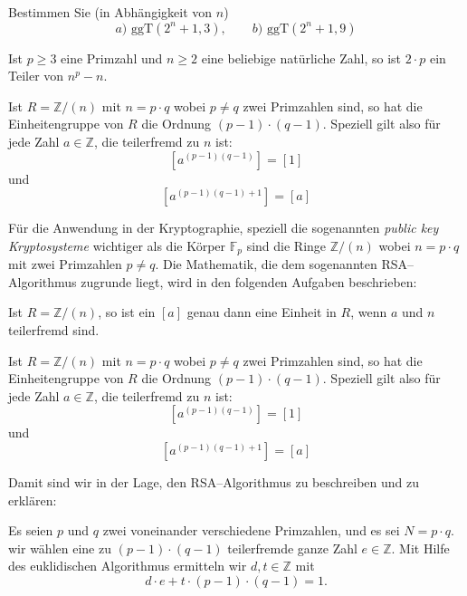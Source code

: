 \begin{aufgabe} Bestimmen Sie (in Abhängigkeit von $n$) 
  	$$ a) \,\, \textrm{ggT}(2^n+1, 3), \qquad b) \,\, \textrm{ggT}(2^n+1, 9) $$
\end{aufgabe}

\begin{aufgabe} Ist $p \geq 3$ eine Primzahl und $n \geq 2$ eine beliebige natürliche Zahl, so ist $2 \cdot p$ 
ein Teiler von $n^p-n$.
\end{aufgabe}

\begin{aufgabe} Ist $R = \mathbb Z/(n)$ mit $n = p \cdot q$ wobei $p \neq q$ zwei Primzahlen sind, so hat die 
Einheitengruppe von $R$ die Ordnung $(p-1) \cdot (q-1)$. Speziell gilt also für jede Zahl $a \in \mathbb Z$, 
die teilerfremd zu $n$ ist: 
  	$$ [a^{(p-1)(q-1)}] = [1] $$
und 
  	$$ [a^{(p-1)(q-1)+1}] = [a] $$
\end{aufgabe}



\bigbreak

Für die Anwendung in der Kryptographie, speziell die sogenannten \textit{public key Kryptosysteme} wichtiger 
als die Körper $\mathbb F_p$ sind die Ringe $\mathbb Z/(n)$ wobei $n = p \cdot q$ mit zwei Primzahlen 
$p \neq q$. Die Mathematik, die dem sogenannten RSA--Algorithmus zugrunde liegt, wird in den folgenden
Aufgaben beschrieben:

\begin{aufgabe} Ist $R = \mathbb Z/(n)$, so ist ein $[a]$ genau dann eine Einheit in $R$, wenn $a$ und $n$ 
teilerfremd sind.
\end{aufgabe}

\begin{aufgabe} Ist $R = \mathbb Z/(n)$ mit $n = p \cdot q$ wobei $p \neq q$ zwei Primzahlen sind, so hat die 
Einheitengruppe von $R$ die Ordnung $(p-1) \cdot (q-1)$. Speziell gilt also für jede Zahl $a \in \mathbb Z$, 
die teilerfremd zu $n$ ist: 
  	$$ [a^{(p-1)(q-1)}] = [1] $$
und 
  	$$ [a^{(p-1)(q-1)+1}] = [a] $$
\end{aufgabe}

Damit sind wir in der Lage, den RSA--Algorithmus zu beschreiben und zu erklären:

Es seien $p$ und $q$ zwei voneinander verschiedene Primzahlen, und es sei $N = p \cdot q$. 
wir wählen eine zu $(p-1) \cdot (q-1)$ teilerfremde ganze Zahl $e \in \mathbb Z$. Mit Hilfe des 
euklidischen Algorithmus ermitteln wir   $d, t \in \mathbb Z$ mit 
 	$$ d \cdot e + t \cdot (p-1) \cdot (q-1) = 1. $$

